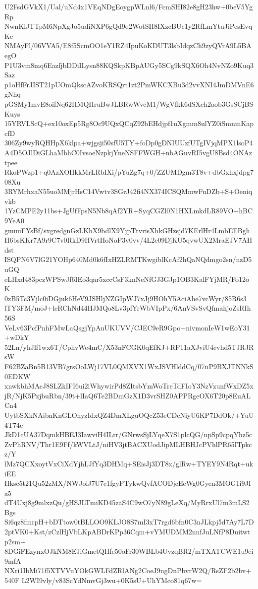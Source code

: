 U2FsdGVkX1/Ual/uNd4x1VEqNDgEoygpWLnl6/FcmSHI82e8gH23hw+0beV5YgRp
NwnKlJTTpM6NpXgJo5udiNXP6gQd9q2WotSH8IXzcBUc1y2RfLmYtuJiPesEvqKe
NMAyFl/06VVA5/E8f5ScmOO1eY1RZ4IpuKoKDUT3lsbIdqzCh9zyQVrA9L5BAegO
P1U3vm8mq6EazfjbDDiILysn88KQSkpKBpAUGy5SCg9kSQX6Oh4NvNZo9Kuq3Saz
p1oHfFrJIST21pUOmQkscAZvoKRSQrt1zt2PmWKCXBu3d2vvXNI4JmDMVnE6gNhq
pGSMy1mvE8oifNq62HMQHruBwJLBRwWvcM1/WgVfkk6dSXeh2aob3GsSCjBSKuys
15YRVLScQ+ex10oxEp5Rg8Oc9UQxQCqZ92bEHdjpf1uXgmm8ulYZ0iSmnmKapcfD
306Zy9wyRQHHpX6klpa+wjgsji50sfU5TY+foDp0gDNIUUzfUTgIVjqMPX1lsoP4
A4D5OJlDiGLhaMbhC0IvsoeNzpkjYneNSFFWGH+nbAGuvRI5vgU8Bsd4ONAztpee
RkoPWzp1+q0AzXOHkkMrLRbIXi/pYuZg7q+0/ZZUMDgm3T8v+dbGxhxjdpg708Xu
3RYMrhxaN55uoMMjrHsC14Vwtv3SGrJ42fi4NX374ICSQMmwFuDZb+S+Oeniqvkb
1YzCMPE2y11bs+JgUfFpsN5Nb8qAf2YR+SyqCGZl0N1HXLmkdLR89VO+hBC9YeA0
gmuuFYsBf/sxgredgnGzLKhX9bdlX9YjpTtvrisXhkGHzsjd7KErlHr4LmbEEBgh
H6bsKKr7A9r9C7v0RkD9HVrtHoNoP3v0vv/4L2e09DjKU5qvwUX2MraEJV7AHdst
ISQPN6V7lG21YOHp640Md0k6fIxHZLRMTKwgiblKcAf2hQaNQdmgo2sn/nzD5uGQ
eLHxd483pczWPSwJf6IEo3qar5xccCsF3knNeNfGJ3GJp1OB3KalFYjMR/Fo12oK
0zB5Tc3Vjlc0iDGjuk6HeV9JSHljNZGIpWJ7xJj9HOhY5AciAhe7vcWyr/85R6s3
lTY3FM/moJ+leRChNd44HJMQo8Lv3pfYrWbVIpPx/6AnVSvSvQfmahjoZsRIh56S
VeLv63PcfPnhFMwLaQsgjYpAuUKUVV/CJEC9eR9Gpo+nivmonIeW1wEoY31+wDkY
52Ln/yhJlf1wx6T/CphvWe4mC/X53nFCGK0qEfKJ+RP11aXJviU4cvhd5TJRJRsW
F62BZaBn5B13VB7grsOoLWj17VL0QMXVX1WxJSVHlddCq/07nP9BXJTNNkS0EDKW
xnwkbhMAcJ8SLZkIFI6ui2iWhywirPd8ZItsbYmWoTreTdFIoY3NzVzunfWxDZ5x
jR/NjK5PzjbuRbn/39t+lIaQ6Te2BDmGzX1D3vrSHZ0APPRgeOX6T20p8EuALCn4
UytbSXkNAibnKnGLOnyzIdxQZ4DmXLguOQcZ53eCDcNiyU6KP7DdOk/+YuU4T74c
JkD1cUA37DqmkHBEJ3IawviH4ILrr/GNrwsSjLYqeX7S1plcQG/npSp9cpqYhz5c
ZvPhRNV/Thr1E9Ff/kWVLtJ/niHV3jtBACXUodJipMLHBHJcPVhlPR65ITpkcz/Y
lMz7QCXxoytVxCiXdYjhLJfYq3DHMq+SEisJj3DT8x/glRw+TYEY9N4Rqt+ukiEE
Hksc5t21Qu52zMX/NWJolJ7U7e1fgyPTykwQvfACODjcEeWg0Gyen3MOG1i9JIa5
dT4Uxj8g9mlxzQu/gHSJLTmiKD45zaS4C9wO7yN89gLeXq/MyRrxUl7m3mLS2Bgs
Si6qz8fmrpH+bDTtow0tBLLOO9KLJO8S7mI3xT7rgd6bfn0C3nJLkpj5d7Ay7L7D
2ptVK0+Kst/zCzlHjVbLKpABDrKPp36Cqm+vYMUDMM2nnfJuLNfP8Duitwtp2sm+
8DGiFEzynxOJkNM8EJiGmetQHfe50oFr30WBLb4UvzqBR2/mTXATCWE1u9ei9mfA
NXri1IbMi71f5XTVVuYOkGWLFdZRlANg2CoeJ9ngDnPbvrW2Q/RsZF2b2bv+540F
L2WI9vly/v83ScYdNmvGj3wu+0K5sU+UhYMco81q67w=
